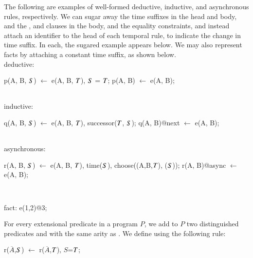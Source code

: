 \begin{example}
The following are examples of well-formed deductive, inductive, and asynchronous rules, respectively.
We can sugar away the time suffixes in the head and body, and the
,  and  clauses in
the body, and the equality constraints, and instead attach an identifier to the head of each
temporal rule, to indicate the change in time suffix.  In each, the sugared example appears
below.  We may also represent facts by attaching a constant time suffix, as shown below.
\\
deductive:
\begin{Dedalus}
p(A, B, \(\DS\)) \(\leftarrow\) e(A, B, \(\DT\)), \(\DS\) = \(\DT\);
p(A, B) \(\leftarrow\) e(A, B);
\end{Dedalus}
\\
inductive:
\begin{Dedalus}
q(A, B, \(\DS\)) \(\leftarrow\) e(A, B, \(\DT\)), successor(\(\DT\), \(\DS\));
q(A, B)@next \(\leftarrow\) e(A, B);
\end{Dedalus}
\\
asynchronous:
\begin{Dedalus}
r(A, B, \(\DS\)) \(\leftarrow\) e(A, B, \(\DT\)), time(\(\DS\)),
   choose((A,B,\(\DT\)), (\(\DS\)));
r(A, B)@async \(\leftarrow\) e(A, B);
\end{Dedalus}
\\
\begin{Dedalus}
fact:
e(1,2)@3;
\end{Dedalus}
\end{example}


For every extensional predicate  in a \lang program $P$, we add to
$P$ two distinguished predicates  and  with the same arity
as .  We define  using the following rule:

\begin{dedalus}
r\pos($\overline{A}$,\(\DS\)) \(\leftarrow\) r($\overline{A}$,\(\DT\)), \(S\)=\(\DT\);
\end{dedalus}

   


